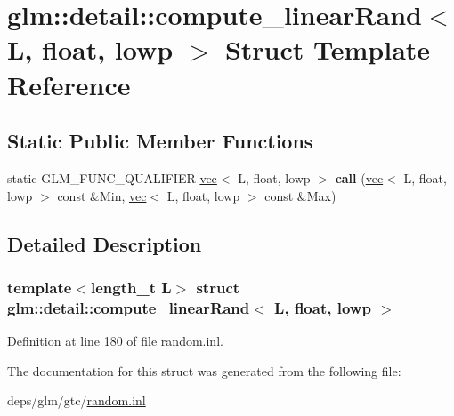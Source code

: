 \hypertarget{structglm_1_1detail_1_1compute__linearRand_3_01L_00_01float_00_01lowp_01_4}{}\section{glm\+:\+:detail\+:\+:compute\+\_\+linear\+Rand$<$ L, float, lowp $>$ Struct Template Reference}
\label{structglm_1_1detail_1_1compute__linearRand_3_01L_00_01float_00_01lowp_01_4}
\subsection*{Static Public Member Functions}
\begin{DoxyCompactItemize}
\item 
\mbox{\label{structglm_1_1detail_1_1compute__linearRand_3_01L_00_01float_00_01lowp_01_4_a0e4dde99be30790876f8c8ba0218f786}} 
static G\+L\+M\+\_\+\+F\+U\+N\+C\+\_\+\+Q\+U\+A\+L\+I\+F\+I\+ER \hyperlink{structglm_1_1vec}{vec}$<$ L, float, lowp $>$ {\bfseries call} (\hyperlink{structglm_1_1vec}{vec}$<$ L, float, lowp $>$ const \&Min, \hyperlink{structglm_1_1vec}{vec}$<$ L, float, lowp $>$ const \&Max)
\end{DoxyCompactItemize}


\subsection{Detailed Description}
\subsubsection*{template$<$length\+\_\+t L$>$\newline
struct glm\+::detail\+::compute\+\_\+linear\+Rand$<$ L, float, lowp $>$}



Definition at line 180 of file random.\+inl.



The documentation for this struct was generated from the following file\+:\begin{DoxyCompactItemize}
\item 
deps/glm/gtc/\hyperlink{random_8inl}{random.\+inl}\end{DoxyCompactItemize}
